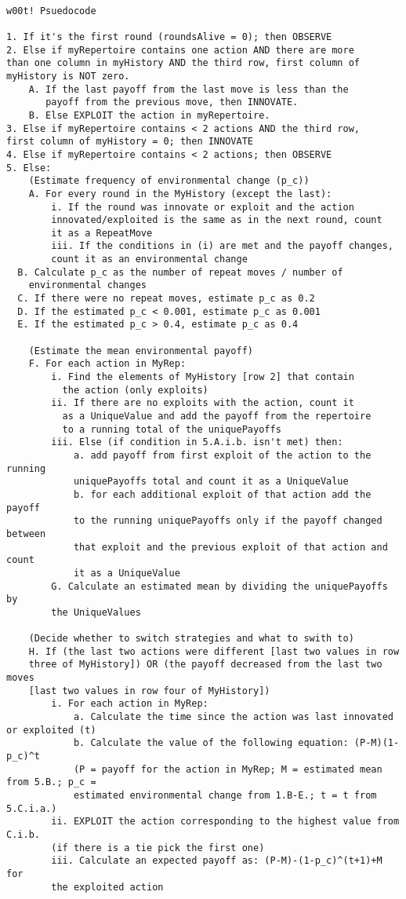 \documentclass[11pt]{article}
\begin{document}
\begin{verbatim}

w00t! Psuedocode

1. If it's the first round (roundsAlive = 0); then OBSERVE
2. Else if myRepertoire contains one action AND there are more 
than one column in myHistory AND the third row, first column of 
myHistory is NOT zero.
	A. If the last payoff from the last move is less than the 
	   payoff from the previous move, then INNOVATE.
	B. Else EXPLOIT the action in myRepertoire.
3. Else if myRepertoire contains < 2 actions AND the third row, 
first column of myHistory = 0; then INNOVATE
4. Else if myRepertoire contains < 2 actions; then OBSERVE
5. Else:
	(Estimate frequency of environmental change (p_c))
	A. For every round in the MyHistory (except the last):
		i. If the round was innovate or exploit and the action 
		innovated/exploited is the same as in the next round, count 
		it as a RepeatMove
		iii. If the conditions in (i) are met and the payoff changes, 
		count it as an environmental change
  B. Calculate p_c as the number of repeat moves / number of 
    environmental changes
  C. If there were no repeat moves, estimate p_c as 0.2
  D. If the estimated p_c < 0.001, estimate p_c as 0.001
  E. If the estimated p_c > 0.4, estimate p_c as 0.4
	
	(Estimate the mean environmental payoff)
	F. For each action in MyRep:
		i. Find the elements of MyHistory [row 2] that contain 
		  the action (only exploits)
		ii. If there are no exploits with the action, count it 
		  as a UniqueValue and add the payoff from the repertoire 
		  to a running total of the uniquePayoffs 
		iii. Else (if condition in 5.A.i.b. isn't met) then:
			a. add payoff from first exploit of the action to the running 
			uniquePayoffs total and count it as a UniqueValue
			b. for each additional exploit of that action add the payoff 
			to the running uniquePayoffs only if the payoff changed between 
			that exploit and the previous exploit of that action and count 
			it as a UniqueValue
    	G. Calculate an estimated mean by dividing the uniquePayoffs by 
    	the UniqueValues

	(Decide whether to switch strategies and what to swith to)
	H. If (the last two actions were different [last two values in row 
	three of MyHistory]) OR (the payoff decreased from the last two moves 
	[last two values in row four of MyHistory])
		i. For each action in MyRep:
			a. Calculate the time since the action was last innovated or exploited (t)
			b. Calculate the value of the following equation: (P-M)(1-p_c)^t
			(P = payoff for the action in MyRep; M = estimated mean from 5.B.; p_c = 
			estimated environmental change from 1.B-E.; t = t from 5.C.i.a.)
		ii. EXPLOIT the action corresponding to the highest value from  C.i.b. 
		(if there is a tie pick the first one)
		iii. Calculate an expected payoff as: (P-M)-(1-p_c)^(t+1)+M for 
		the exploited action


\end{verbatim}
\end{document}
